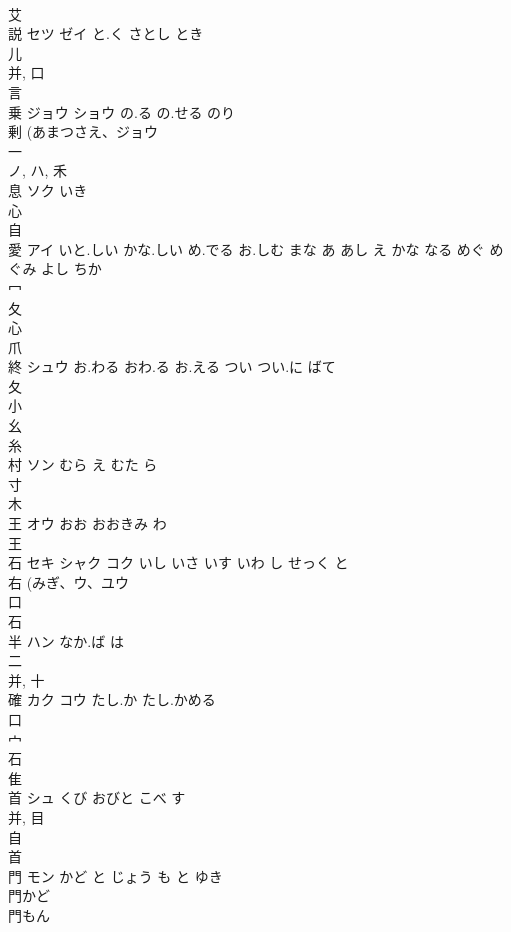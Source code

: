 \documentclass[8pt]{extreport}
\begin{document}
\begin{CJK}{UTF8}{min}
\\	艾 
\\	説	セツ ゼイ	と.く さとし とき	
\\	儿 
\\	并, 口 
\\	言 
\\	乗	ジョウ ショウ	の.る の.せる のり	
\\	剰 (あまつさえ、ジョウ 
\\	一 
\\	ノ, ハ, 禾 
\\	息	ソク	いき	
\\	心 
\\	自 
\\	愛	アイ	いと.しい かな.しい め.でる お.しむ まな あ あし え かな なる めぐ めぐみ よし ちか	
\\	冖 
\\	夂 
\\	心 
\\	爪 
\\	終	シュウ	お.わる おわ.る お.える つい つい.に ばて	
\\	夂 
\\	小 
\\	幺 
\\	糸 
\\	村	ソン	むら え むた ら	
\\	寸 
\\	木 
\\	王	オウ	おお おおきみ わ	
\\	王 
\\	石	セキ シャク コク	いし いさ いす いわ し せっく と	
\\	右 (みぎ、ウ、ユウ 
\\	口 
\\	石 
\\	半	ハン	なか.ば は	
\\	二 
\\	并, 十 
\\	確	カク コウ	たし.か たし.かめる	
\\	口 
\\	宀 
\\	石 
\\	隹 
\\	首	シュ	くび おびと こべ す	
\\	并, 目 
\\	自 
\\	首 
\\	門	モン	かど と じょう も と ゆき	
\\	門かど 
\\	門もん 

\end{CJK}
\end{document}

